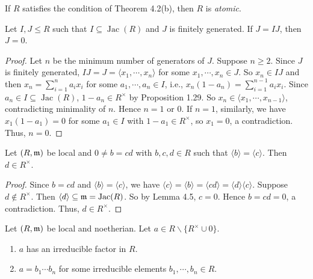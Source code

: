 \begin{definition}
    If $R$ satisfies the condition of Theorem 4.2(b), then $R$ is \emph{atomic}.
\end{definition}

\begin{lemma}
    Let $I,J \leq R$ such that $I \subseteq \operatorname{Jac}(R)$ and $J$ is finitely generated. If $J = IJ$, then $J = 0$.
\end{lemma}

\begin{proof}
    Let $n$ be the minimum number of generators of $J$. Suppose $n \geq 2$. Since $J$ is finitely generated, $IJ = J = \langle x_1,\cdots,x_n \rangle$ for some $x_1,\cdots,x_n \in J$. So $x_n \in IJ$ and then $x_n = \sum_{i=1}^{n}a_ix_i$ for some $a_1,\cdots,a_n \in I$, i.e., $x_n(1-a_n) = \sum_{i=1}^{n-1}a_ix_i$. Since $a_n \in I \subseteq \operatorname{Jac}(R)$, $1-a_n \in R^{\times}$ by Proposition 1.29. So $x_n \in \langle x_1,\cdots,x_{n-1} \rangle$, contradicting minimality of $n$. Hence $n = 1$ or $0$. If $n = 1$, similarly, we have $x_1(1-a_1) = 0$ for some $a_1 \in I$ with $1-a_1 \in R^{\times}$, so $x_1 = 0$, a contradiction. Thus, $n = 0$.
\end{proof}

\begin{lemma}
    Let $(R,\mathfrak{m})$ be local and $0 \neq b = cd$ with $b,c,d \in R$ such that $\langle b \rangle = \langle c \rangle$. Then $d \in R^{\times}$.
\end{lemma}

\begin{proof}
    Since $b = cd$ and $\langle b \rangle = \langle c \rangle$, we have $\langle c \rangle = \langle b \rangle = \langle cd \rangle = \langle d \rangle \langle c \rangle$. Suppose $d \not \in R^{\times}$. Then $\langle d \rangle \subseteq \mathfrak{m} = \operatorname{Jac}(R)$. So by Lemma 4.5, $c = 0$. Hence $b = cd = 0$, a contradiction. Thus, $d \in R^{\times}$.
\end{proof}

\begin{theorem}
    Let $(R,\mathfrak{m})$ be local and noetherian. Let $a \in R \smallsetminus \{R^{\times} \cup 0\}$. 
    \begin{enumerate}
        \item $a$ has an irreducible factor in $R$.
        \item $a = b_1 \cdots b_n$ for some irreducible elements $b_1,\cdots,b_n \in R$.
    \end{enumerate}
\end{theorem}

